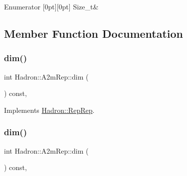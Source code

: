 \begin{DoxyEnumFields}{Enumerator}
[0pt][0pt]{}\mbox{\label{structHadron_1_1A2mRep_adfb179d9e77593de0e7abdc79ea099c0a5e3da09ce3082c28664c38da1b8d6ac3}} 
Size\+\_\+t&\\
\hline

\end{DoxyEnumFields}


\subsection{Member Function Documentation}
\mbox{\label{structHadron_1_1A2mRep_afa793882b0e3f47c922a65b8a17750a3}} 
\subsubsection{\texorpdfstring{dim()}{dim()}\hspace{0.1cm}{\footnotesize\ttfamily [1/3]}}
{\footnotesize\ttfamily int Hadron\+::\+A2m\+Rep\+::dim (\begin{DoxyParamCaption}{ }\end{DoxyParamCaption}) const\hspace{0.3cm}{\ttfamily [inline]}, {\ttfamily [virtual]}}



Implements \mbox{\hyperlink{structHadron_1_1RepRep_a92c8802e5ed7afd7da43ccfd5b7cd92b}{Hadron\+::\+Rep\+Rep}}.

\mbox{\label{structHadron_1_1A2mRep_afa793882b0e3f47c922a65b8a17750a3}} 
\subsubsection{\texorpdfstring{dim()}{dim()}\hspace{0.1cm}{\footnotesize\ttfamily [2/3]}}
{\footnotesize\ttfamily int Hadron\+::\+A2m\+Rep\+::dim (\begin{DoxyParamCaption}{ }\end{DoxyParamCaption}) const\hspace{0.3cm}{\ttfamily [inline]}, {\ttfamily [virtual]}}



